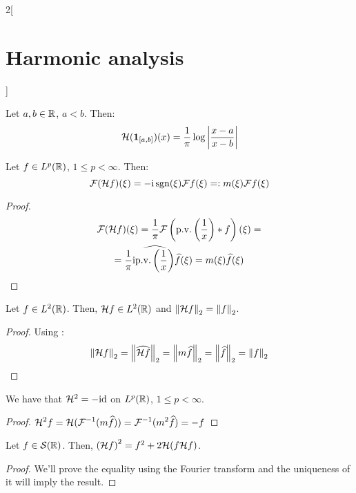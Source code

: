 \documentclass[../../../main_math.tex]{subfiles}
\begin{document}
\begin{multicols}{2}[\section{Harmonic analysis}]
\begin{remark}
  \end{remark}
  \begin{lemma}
    Let $a,b\in\mathbb{R}$, $a<b$. Then:
    $$
      \mathcal{H}(\boldsymbol{\mathrm{1}}_{[a,b]})(x)=\frac{1}{\pi}\log\left| \frac{x-a}{x-b}\right|
    $$
  \end{lemma}
  \begin{proposition}
    Let $f\in L^p(\mathbb{R})$, $1\leq p<\infty$. Then:
    $$
      \mathcal{F}(\mathcal{H} f)(\xi)=-\mathrm{i}\operatorname{sgn}(\xi)\mathcal{F} f(\xi)=:m(\xi)\mathcal{F} f(\xi)
    $$
  \end{proposition}
  \begin{proof}
    \begin{multline*}
      \mathcal{F}(\mathcal{H} f)(\xi)=\frac{1}{\pi}\mathcal{F}\left(\mathrm{p.v.}\left(\frac{1}{x}\right)*f\right)(\xi)=\\
      =\frac{1}{\pi}\mathrm{i} \widehat{\mathrm{p.v.}\left(\frac{1}{x}\right)}\widehat{f}(\xi)=m(\xi)\widehat{f}(\xi)
    \end{multline*}
  \end{proof}
  \begin{lemma}
    Let $f\in L^2(\mathbb{R})$. Then, $\mathcal{H} f\in L^2(\mathbb{R})$ and $\left\|\mathcal{H} f\right\|_{2}= \left\|f\right\|_{2}$.
  \end{lemma}
  \begin{proof}
    Using :
    $$
      \left\|\mathcal{H} f\right\|_{2} = \left\|\widehat{\mathcal{H} f}\right\|_{2}=\left\|m\widehat{f}\right\|_{2}=\left\|\widehat{f}\right\|_{2}=\left\|f\right\|_{2}
    $$
  \end{proof}
  \begin{lemma}
    We have that $\mathcal{H}^2=-\mathrm{id}$ on $L^p(\mathbb{R})$, $1\leq p<\infty$.
  \end{lemma}
  \begin{proof}
    $\displaystyle
      \mathcal{H}^2 f=\mathcal{H}(\mathcal{F}^{-1}(m\widehat{f}))=\mathcal{F}^{-1}(m^2\widehat{f})=-f
    $
  \end{proof}
  \begin{lemma}\label{HA:prethmSingInt}
    Let $f\in \mathcal{S}(\mathbb{R})$. Then, ${(\mathcal{H} f)}^2=f^2+2\mathcal{H}(f\mathcal{H} f)$.
  \end{lemma}
  \begin{proof}
    We'll prove the equality using the Fourier transform and the uniqueness of it will imply the result.


\end{proof}
\end{multicols}
\end{document}
